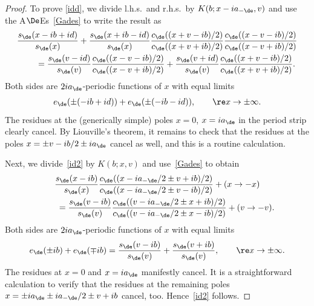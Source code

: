 \documentclass[pdftex]{sigma}
\numberwithin{equation}{section}
\begin{document}
\begin{proof}
To prove \eqref{idd}, we divide l.h.s.\ and r.h.s.\ by $K(b;x-ia_{-\de},v)$ and use the A$\De$Es~\eqref{Gades} to write the result as
\begin{gather}
  \frac{s_{\de}(x-ib+id)}{s_{\de}(x)}+\frac{s_{\de}(x+ib-id)}{s_{\de}(x)}\frac{c_{\de}((x+ v-ib)/2)}{c_{\de}((x+ v+ib)/2)}\frac{c_{\de}((x- v-ib)/2)}{c_{\de}((x- v+ib)/2)}  \nonumber \\
\qquad{} = \frac{s_{\de}(v-id)}{s_{\de}(v)} \frac{c_{\de}((x-v-ib)/2)}{c_{\de}((x-v+ib)/2)} +   \frac{s_{\de}(v+id)}{s_{\de}(v)} \frac{c_{\de}((x+v-ib)/2)}{c_{\de}((x+v+ib)/2)}.\label{idq}
\end{gather}
Both sides are $2ia_{\de}$-periodic functions of $x$ with equal limits
\begin{gather}
e_{\de}(\pm (-ib+id))+e_{\de}(\pm (-ib-id)),\qquad \re x \to\pm\infty.
\end{gather}
The residues at the (generically simple) poles $x=0$, $x=ia_{\de}$ in the period strip clearly cancel. By Liouville's theorem, it remains to check that the residues at the poles $x=\pm v -ib/2\pm ia_{\de}$ cancel as well, and this is a routine calculation.

Next, we divide~\eqref{id2} by $K(b;x,v)$ and use~\eqref{Gades} to obtain
\begin{gather}
  \frac{s_{\de}(x-ib)}{s_{\de}(x)}\frac{c_{\de}((x-ia_{-\de}/2\pm v +ib)/2)}{c_{\de}((x-ia_{-\de}/2\pm v -ib)/2)}+ (x\to -x)
\nonumber \\
\qquad{} = \frac{s_{\de}(v-ib)}{s_{\de}(v)} \frac{c_{\de}((v-ia_{-\de}/2\pm x +ib)/2)}{c_{\de}((v-ia_{-\de}/2\pm x -ib)/2)}+ (v\to -v).
\end{gather}
Both sides are $2ia_{\de}$-periodic functions of $x$ with equal limits
\begin{gather}
e_{\de}(\pm ib)+e_{\de}(\mp ib)=\frac{s_{\de}(v-ib)}{s_{\de}(v)} +\frac{s_{\de}(v+ib)}{s_{\de}(v)},\qquad \re x \to\pm\infty.
\end{gather}
The residues at $x=0$ and $x=ia_{\de}$ manifestly cancel. It is a straightforward calculation to verify that the residues at the remaining poles $x=\pm ia_{\de}\pm ia_{-\de}/2\pm v +ib$ cancel, too. Hence~\eqref{id2} follows.


\end{proof}
\end{document}
